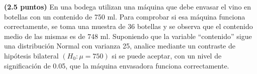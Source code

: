 
\textbf{(2.5 puntos)} En una bodega utilizan una máquina que debe envasar el vino en botellas con un contenido de 750 ml. Para comprobar si esa máquina funciona correctamente, se toma una muestra de 36 botellas y se observa que el contenido medio de las mismas es de 748 ml. Suponiendo que la variable ``contenido'' sigue una distribución Normal con varianza 25, analice mediante un contraste de hipótesis bilateral $(H_0:\mu=750)$ si se puede aceptar, con un nivel de significación de 0.05, que la máquina envasadora funciona correctamente.
